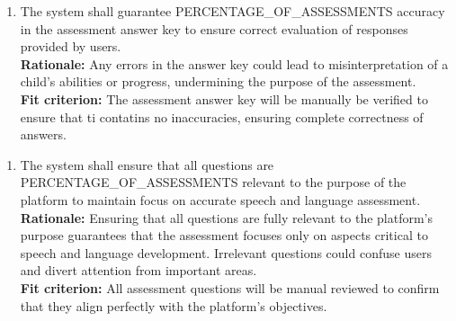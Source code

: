 \documentclass[12pt]{article}
\begin{document}
\begin{enumerate}[label={PR-PA}4. ]
  \item The system shall guarantee PERCENTAGE\_OF\_ASSESSMENTS accuracy in the assessment answer key to ensure correct evaluation of responses provided by users.\\
  \textbf{Rationale: }Any errors in the answer key could lead to misinterpretation of a child’s abilities or progress, undermining the purpose of the assessment.\\
  \textbf{Fit criterion: }The assessment answer key will be manually be verified to ensure that ti contatins no inaccuracies, ensuring complete correctness of answers.  
\end{enumerate}
\begin{enumerate}[label={PR-PA}5. ]
  \item The system shall ensure that all questions are\\ PERCENTAGE\_OF\_ASSESSMENTS relevant to the purpose of the platform to maintain focus on accurate speech and language assessment.\\
  \textbf{Rationale: }Ensuring that all questions are fully relevant to the platform’s purpose guarantees that the assessment focuses only on aspects critical to speech and language development. Irrelevant questions could confuse users and divert attention from important areas.\\
  \textbf{Fit criterion: }All assessment questions will be manual reviewed to confirm that they align perfectly with the platform's objectives.  
\end{enumerate}
\end{document}
